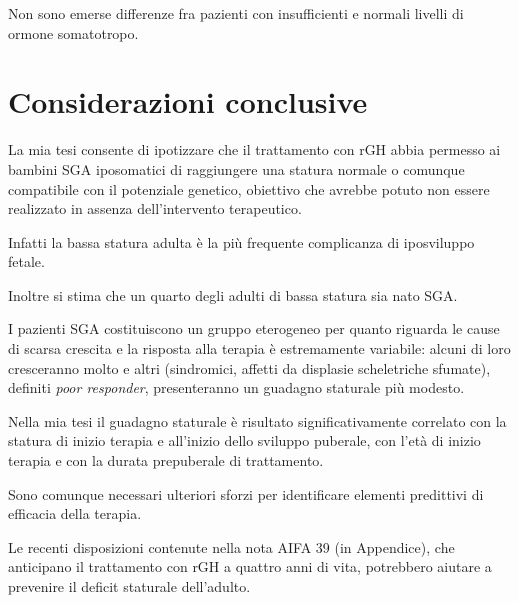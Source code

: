 Non sono emerse differenze fra pazienti con insufficienti e normali livelli di ormone somatotropo.

\chapter{Considerazioni conclusive}

La mia tesi consente di ipotizzare che il trattamento con rGH abbia permesso ai bambini SGA iposomatici di raggiungere una statura normale o comunque compatibile con il potenziale genetico, obiettivo che avrebbe potuto non essere realizzato in assenza dell'intervento terapeutico. 

Infatti la bassa statura adulta è la più frequente complicanza di iposviluppo fetale.

Inoltre si stima che un quarto degli adulti di bassa statura sia nato SGA. 

I pazienti SGA costituiscono un gruppo eterogeneo per quanto riguarda le cause di scarsa crescita e la risposta alla terapia è estremamente variabile:  alcuni di loro cresceranno molto e altri (sindromici, affetti da displasie scheletriche sfumate), definiti \textit{poor responder}\cite{bang2011comparison}, presenteranno un guadagno staturale più modesto.

Nella mia tesi il guadagno staturale è risultato significativamente correlato con la statura di inizio terapia e all'inizio dello sviluppo puberale, con l'età di inizio terapia e con la durata prepuberale di trattamento.

Sono comunque necessari ulteriori sforzi per identificare elementi predittivi di efficacia della terapia.

Le recenti disposizioni contenute nella nota AIFA 39 (in Appendice), che anticipano il trattamento con rGH  a quattro anni di vita, potrebbero aiutare a prevenire il deficit staturale dell'adulto.
